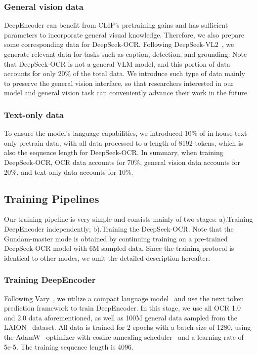 \documentclass[11pt, a4paper, logo, copyright, nonumbering]{deepseek}
\begin{document}
\begin{CJK*}{UTF8}{gbsn}
\subsubsection{General vision data}
DeepEncoder can benefit from CLIP's pretraining gains and has sufficient parameters to incorporate general visual knowledge. Therefore, we also prepare some corresponding data for DeepSeek-OCR. Following DeepSeek-VL2~\cite{wu2024deepseek}, we generate relevant data for tasks such as caption, detection, and grounding. Note that DeepSeek-OCR is not a general VLM model, and this portion of data accounts for only 20\% of the total data. We introduce such type of data mainly to preserve the general vision interface, so that researchers interested in our model and general vision task can conveniently advance their work in the future.

\subsubsection{Text-only data}
To ensure the model's language capabilities, we introduced 10\% of in-house text-only pretrain data, with all data processed to a length of 8192 tokens, which is also the sequence length for DeepSeek-OCR. In summary, when training DeepSeek-OCR, OCR data accounts for 70\%, general vision data accounts for 20\%, and text-only data accounts for 10\%.

\subsection{Training Pipelines}
Our training pipeline is very simple and consists mainly of two stages: a).Training DeepEncoder independently; b).Training the DeepSeek-OCR. Note that the Gundam-master mode is obtained by continuing training on a pre-trained DeepSeek-OCR model with 6M sampled data. Since the training protocol is identical to other modes, we omit the detailed description hereafter.

\subsubsection{Training DeepEncoder}
Following Vary~\cite{wei2024vary}, we utilize a compact language model~\cite{OPT-IML} and use the next token prediction framework to train DeepEncoder.  In this stage, we use all OCR 1.0 and 2.0 data aforementioned, as well as 100M general data sampled from the LAION~\cite{schuhmann2021laion} dataset. All data is trained for 2 epochs with a batch size of 1280, using the AdamW~\cite{AdamW} optimizer with cosine annealing scheduler~\cite{loshchilov2016sgdr} and a learning rate of 5e-5. The training sequence length is 4096.



\end{CJK*}
\end{document}
